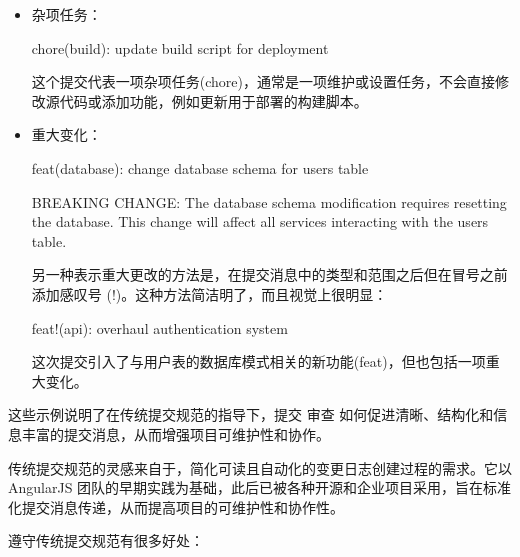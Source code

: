 \begin{itemize}
\item
杂项任务：

\begin{shell}
chore(build): update build script for deployment
\end{shell}

这个提交代表一项杂项任务(chore)，通常是一项维护或设置任务，不会直接修改源代码或添加功能，例如更新用于部署的构建脚本。

\item
重大变化：

\begin{shell}
feat(database): change database schema for users table

BREAKING CHANGE: The database schema modification requires resetting the database. This change will affect all services interacting with the users table.
\end{shell}

另一种表示重大更改的方法是，在提交消息中的类型和范围之后但在冒号之前添加感叹号 (!)。这种方法简洁明了，而且视觉上很明显：

\begin{shell}
feat!(api): overhaul authentication system
\end{shell}

这次提交引入了与用户表的数据库模式相关的新功能(feat)，但也包括一项重大变化。

\end{itemize}

这些示例说明了在传统提交规范的指导下，提交 审查 如何促进清晰、结构化和信息丰富的提交消息，从而增强项目可维护性和协作。


传统提交规范的灵感来自于，简化可读且自动化的变更日志创建过程的需求。它以 AngularJS 团队的早期实践为基础，此后已被各种开源和企业项目采用，旨在标准化提交消息传递，从而提高项目的可维护性和协作性。


遵守传统提交规范有很多好处：

